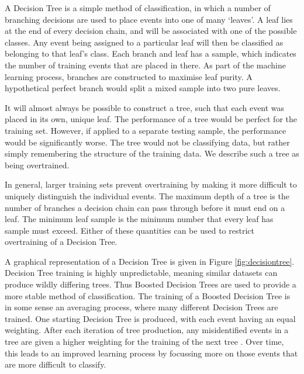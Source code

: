 \documentclass[11pt]{article}
\begin{document}
A Decision Tree is a simple method of classification, in which a number of branching decisions are used to place events into one of many \textquoteleft leaves'. A leaf lies at the end of every decision chain, and will be associated with one of the possible classes. Any event being assigned to a particular leaf will then be classified as belonging to that leaf's class. Each branch and leaf has a sample, which indicates the number of training events that are placed in there. As part of the machine learning process, branches are constructed to maximise leaf purity. A hypothetical perfect branch would split a mixed sample into two pure leaves. 

It will almost always be possible to construct a tree, such that each event was placed in its own, unique leaf. The performance of a tree would be perfect for the training set. However, if applied to a separate testing sample, the performance would be significantly worse. The tree would not be classifying data, but rather simply remembering the structure of the training data. We describe such a tree as being overtrained.

In general, larger training sets prevent overtraining by making it more difficult to uniquely distinguish the individual events. The maximum depth of a tree is the number of branches a decision chain can pass through before it must end on a leaf. The minimum leaf sample is the minimum number that every leaf has sample must exceed. Either of these quantities can be used to restrict overtraining of a Decision Tree.

A graphical representation of a Decision Tree is given in Figure \ref{fig:decisiontree}. Decision Tree training is highly unpredictable, meaning similar datasets can produce wildly differing trees. Thus Boosted Decision Trees are used to provide a more stable method of classification. The training of a Boosted Decision Tree is in some sense an averaging process, where many different Decision Trees are trained. One starting Decision Tree is produced, with each event having an equal weighting. After each iteration of tree production, any misidentified events in a tree are given a higher weighting for the training of the next tree \cite{Roe:2004na}. Over time, this leads to an improved learning process by focussing more on those events that are more difficult to classify.
\end{document}
